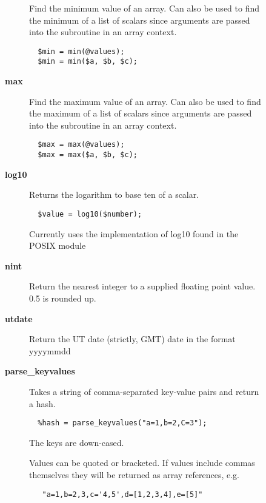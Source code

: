 \begin{description}
\begin{description}
\begin{description}
Find the minimum value of an array. Can also be used to find
the minimum of a list of scalars since arguments are passed into
the subroutine in an array context.

\begin{verbatim}
  $min = min(@values);
  $min = min($a, $b, $c);
\end{verbatim}

\item[{\textbf{max}}] \mbox{}

Find the maximum value of an array. Can also be used to find
the maximum of a list of scalars since arguments are passed into
the subroutine in an array context.

\begin{verbatim}
  $max = max(@values);
  $max = max($a, $b, $c);
\end{verbatim}

\item[{\textbf{log10}}] \mbox{}

Returns the logarithm to base ten of a scalar.

\begin{verbatim}
  $value = log10($number);
\end{verbatim}


Currently uses the implementation of log10 found in the
POSIX module


\item[{\textbf{nint}}] \mbox{}

Return the nearest integer to a supplied floating point
value. 0.5 is rounded up.


\item[{\textbf{utdate}}] \mbox{}

Return the UT date (strictly, GMT) date in the format yyyymmdd


\item[{\textbf{parse\_keyvalues}}] \mbox{}

Takes a string of comma-separated key-value pairs and return a hash.

\begin{verbatim}
  %hash = parse_keyvalues("a=1,b=2,C=3");
\end{verbatim}


The keys are down-cased.



Values can be quoted or bracketed. If values include commas themselves
they will be returned as array references, e.g.

\begin{verbatim}
   "a=1,b=2,3,c='4,5',d=[1,2,3,4],e=[5]"
\end{verbatim}



\end{description}
\end{description}
\end{description}
